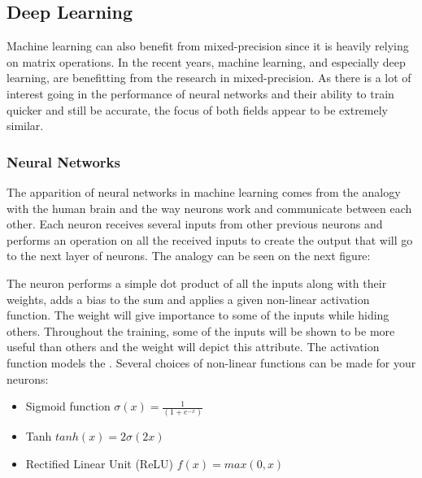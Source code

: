 \subsection{Deep Learning}

Machine learning can also benefit from mixed-precision since it is heavily relying on matrix operations. In the recent years, machine learning, and especially deep learning, are benefitting from the research in mixed-precision. As there is a lot of interest going in the performance of neural networks and their ability to train quicker and still be accurate, the focus of both fields appear to be extremely similar.


\subsubsection{Neural Networks}

The apparition of neural networks in machine learning comes from the analogy with the human brain and the way neurons work and communicate between each other. Each neuron receives several inputs from other previous neurons and performs an operation on all the received inputs to create the output that will go to the next layer of neurons. The analogy can be seen on the next figure:


The neuron performs a simple dot product of all the inputs along with their weights, adds a bias to the sum and applies a given non-linear activation function. The weight will give importance to some of the inputs while hiding others. Throughout the training, some of the inputs will be shown to be more useful than others and the weight will depict this attribute. The activation function models the . Several choices of non-linear functions can be made for your neurons:
\begin{itemize}
  \item Sigmoid function $\sigma(x) = \frac{1}{(1+e^{-x})}$
  \item Tanh $tanh(x) = 2\sigma(2x)$
  \item Rectified Linear Unit (ReLU) $ f(x) = max(0,x) $
\end{itemize}

